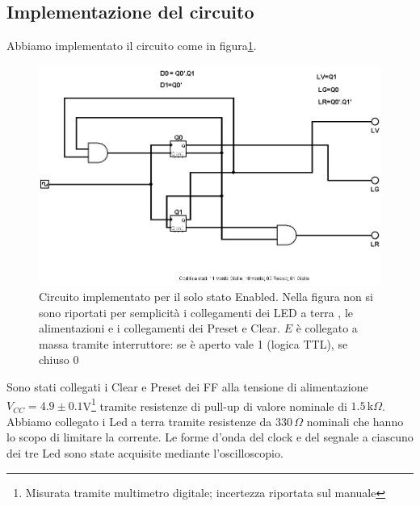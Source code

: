 \documentclass[10pt,a4paper]{article}
\begin{document}
\subsection{Implementazione del circuito}
Abbiamo implementato il circuito come in figura\ref{fig:circenable}.
\begin{figure}[!htb]
\centering
\includegraphics[scale=0.5]{circenable.png}
\caption{Circuito implementato per il solo stato Enabled. Nella figura non si sono riportati per semplicità i collegamenti dei LED a terra , le alimentazioni e i collegamenti dei Preset e Clear. $E$ è collegato a massa tramite interruttore: se è aperto vale 1 (logica TTL), se chiuso 0\label{fig:circenable}}
\end{figure}
Sono stati collegati i Clear e Preset dei FF alla tensione di alimentazione $V_{CC} = 4.9\pm0.1 $V\footnote{Misurata tramite multimetro digitale; incertezza riportata sul manuale} tramite resistenze di pull-up di valore nominale di $1.5\,\mbox{k}\Omega$. Abbiamo collegato i Led a terra tramite resistenze da $330\,\Omega$ nominali che hanno lo scopo di limitare la corrente.
Le forme d'onda del clock e del segnale a ciascuno dei tre Led sono state acquisite mediante l'oscilloscopio.
\end{document}
